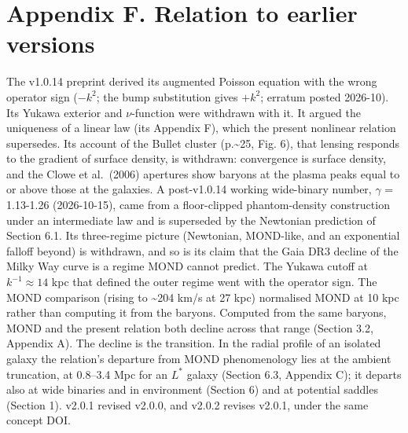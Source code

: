 \documentclass[
  10pt,
]{article}
\begin{document}
\section{Appendix F. Relation to earlier versions}\label{appendix-f.-relation-to-v1.0.14}

The v1.0.14 preprint derived its augmented Poisson equation with the wrong operator sign ($-k^2$; the bump substitution gives $+k^2$; erratum posted 2026-10). Its Yukawa exterior and $\nu$-function were withdrawn with it. It argued the uniqueness of a linear law (its Appendix F), which the present nonlinear relation supersedes. Its account of the Bullet cluster (p.\textasciitilde{}25, Fig. 6), that lensing responds to the gradient of surface density, is withdrawn: convergence is surface density, and the Clowe et al.~(2006) apertures show baryons at the plasma peaks equal to or above those at the galaxies. A post-v1.0.14 working wide-binary number, $\gamma$ = 1.13-1.26 (2026-10-15), came from a floor-clipped phantom-density construction under an intermediate law and is superseded by the Newtonian prediction of Section 6.1. Its three-regime picture (Newtonian, MOND-like, and an exponential falloff beyond) is withdrawn, and so is its claim that the Gaia DR3 decline of the Milky Way curve is a regime MOND cannot predict. The Yukawa cutoff at $k^{-1}\approx14$ kpc that defined the outer regime went with the operator sign. The MOND comparison (rising to \textasciitilde{}204 km/s at 27 kpc) normalised MOND at 10 kpc rather than computing it from the baryons. Computed from the same baryons, MOND and the present relation both decline across that range (Section 3.2, Appendix A). The decline is the transition. In the radial profile of an isolated galaxy the relation's departure from MOND phenomenology lies at the ambient truncation, at 0.8--3.4 Mpc for an $L^*$ galaxy (Section 6.3, Appendix C); it departs also at wide binaries and in environment (Section 6) and at potential saddles (Section 1). v2.0.1 revised v2.0.0, and v2.0.2 revises v2.0.1, under the same concept DOI.
\end{document}
